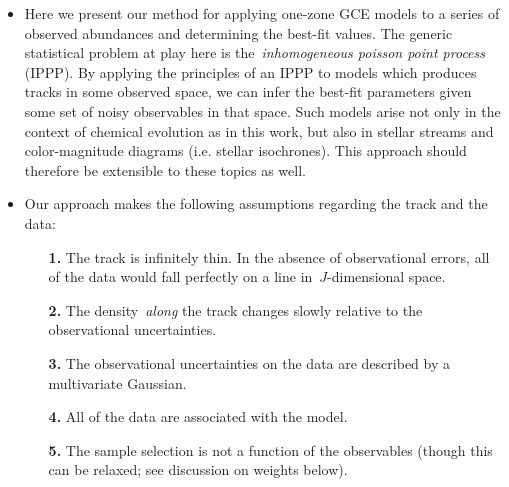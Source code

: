 \documentclass[ms.tex]{subfiles}
\begin{document}
\begin{itemize}

	\item Here we present our method for applying one-zone GCE models to a
	series of observed abundances and determining the best-fit values.
	The generic statistical problem at play here is the~\textit{inhomogeneous
	poisson point process} (IPPP).
	By applying the principles of an IPPP to models which produces tracks in
	some observed space, we can infer the best-fit parameters given some set
	of noisy observables in that space.
	Such models arise not only in the context of chemical evolution as in this
	work, but also in stellar streams and color-magnitude diagrams (i.e.
	stellar isochrones).
	This approach should therefore be extensible to these topics as well.


	\item Our approach makes the following assumptions regarding the track and
	the data:
	\begin{itemize}

		\item[\textbf{1.}] The track is infinitely thin. In the absence of
		observational errors, all of the data would fall perfectly on a line
		in~$J$-dimensional space.

		\item[\textbf{2.}] The density~\textit{along} the track changes slowly
		relative to the observational uncertainties.

		\item[\textbf{3.}] The observational uncertainties on the data are
		described by a multivariate Gaussian.

		\item[\textbf{4.}] All of the data are associated with the model.

		\item[\textbf{5.}] The sample selection is not a function of the
		observables (though this can be relaxed; see discussion on weights
		below).


\end{itemize}
\end{itemize}
\end{document}
